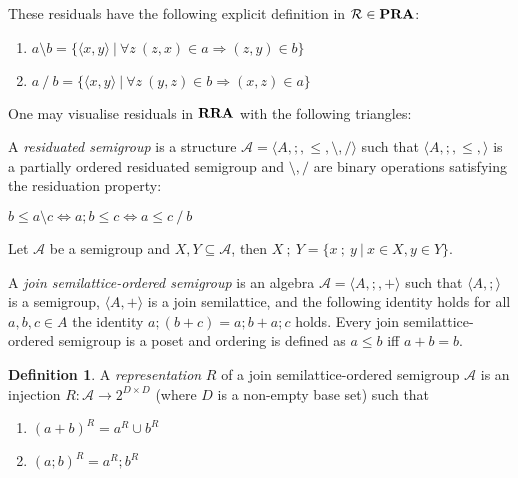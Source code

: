 \documentclass[a4paper]{article}
\theoremstyle{definition}
\newtheorem{definition}{Definition}
\theoremstyle{theorem}
\theoremstyle{proposition}
\theoremstyle{lemma}
\theoremstyle{ex}
\theoremstyle{corollary}
\theoremstyle{claim}
\begin{document}
These residuals have the following explicit definition in $\mathcal{R} \in {\bf PRA}$:
\begin{enumerate}
  \item $a \setminus b = \{ \langle x, y \rangle \: | \: \forall z \: (z, x) \in a \Rightarrow (z, y) \in b \}$
  \item $a \: / \: b = \{ \langle x, y \rangle \: | \: \forall z \: (y, z) \in b \Rightarrow (x, z) \in a \}$
\end{enumerate}

One may visualise residuals in ${\bf RRA}$ with the following triangles:


A \emph{residuated semigroup} is a structure $\mathcal{A} = \langle A, ;, \leq, \setminus, / \rangle$ such that $\langle A, ;, \leq, \rangle$ is a partially ordered residuated semigroup and $\setminus, /$ are binary operations satisfying the residuation property:

  \begin{center}
    $b \leq a \setminus c \Leftrightarrow a ; b \leq c \Leftrightarrow a \leq c \: / \: b$
  \end{center}

Let $\mathcal{A}$ be a semigroup and $X, Y \subseteq \mathcal{A}$, then $X \: ; \: Y = \{ x \: ; \: y \: | \: x \in X, y \in Y \}$.

A \emph{join semilattice-ordered semigroup} is an algebra $\mathcal{A} = \langle A, ;, + \rangle$ such that $\langle A, ; \rangle$ is a semigroup, $\langle A, + \rangle$ is a join semilattice, and the following identity holds for all $a, b, c \in A$ the identity $a ; (b + c) = a ; b + a ; c$ holds.
Every join semilattice-ordered semigroup is a poset and ordering is defined as $a \leq b$ iff $a + b = b$.

\begin{definition}\label{joinrep}
  A \emph{representation} $R$ of a join semilattice-ordered semigroup $\mathcal{A}$
  is an injection $R : \mathcal{A} \to 2^{D \times D}$ (where $D$ is a non-empty base set) such that
  \begin{enumerate}
    \item $(a + b)^R = a^R \cup b^R$
    \item $(a ; b)^R = a^R ; b^R$
  \end{enumerate}
\end{definition}
\end{document}
